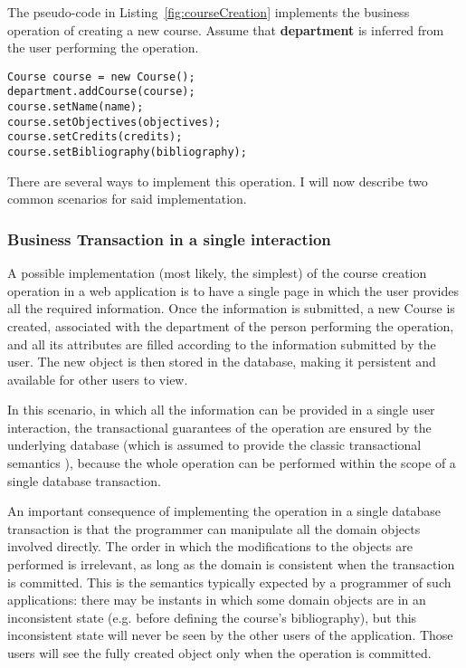 \documentclass{llncs}
\begin{document}
The pseudo-code in Listing~\ref{fig:courseCreation} implements the
business operation of creating a new course. Assume that {\bf
  department} is inferred from the user performing the operation.

\begin{lstlisting}[float]
Course course = new Course();
department.addCourse(course);
course.setName(name);
course.setObjectives(objectives);
course.setCredits(credits);
course.setBibliography(bibliography);
\end{lstlisting}

There are several ways to implement this operation. I will now
describe two common scenarios for said implementation.

\subsubsection{Business Transaction in a single interaction}

A possible implementation (most likely, the simplest) of the course
creation operation in a web application is to have a single page in
which the user provides all the required information. Once the
information is submitted, a new Course is created, associated with the
department of the person performing the operation, and all its
attributes are filled according to the information submitted by the
user. The new object is then stored in the database, making it
persistent and available for other users to view.

In this scenario, in which all the information can be provided in a
single user interaction, the transactional guarantees of the operation
are ensured by the underlying database (which is assumed to provide
the classic transactional semantics \cite{gray1981transaction}),
because the whole operation can be performed within the scope of a
single database transaction.

An important consequence of implementing the operation in a single
database transaction is that the programmer can manipulate all the
domain objects involved directly. The order in which the modifications
to the objects are performed is irrelevant, as long as the domain is
consistent when the transaction is committed. This is the semantics
typically expected by a programmer of such applications: there may be
instants in which some domain objects are in an inconsistent state
(e.g. before defining the course's bibliography), but this
inconsistent state will never be seen by the other users of the
application. Those users will see the fully created object only when
the operation is committed.
\end{document}
